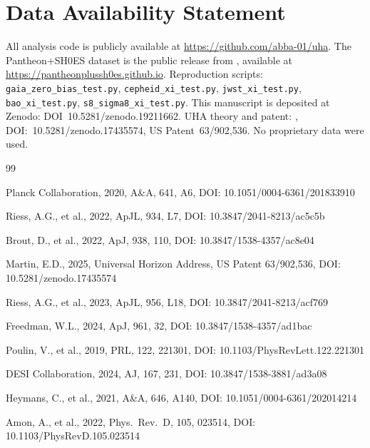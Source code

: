 \documentclass[12pt,a4paper]{article}
\begin{document}
\section*{Data Availability Statement}

All analysis code is publicly available at \url{https://github.com/abba-01/uha}.
The Pantheon+SH0ES dataset is the public release from \citet{brout2022},
available at \url{https://pantheonplussh0es.github.io}.
Reproduction scripts: \texttt{gaia\_zero\_bias\_test.py},
\texttt{cepheid\_xi\_test.py}, \texttt{jwst\_xi\_test.py},
\texttt{bao\_xi\_test.py}, \texttt{s8\_sigma8\_xi\_test.py}.
This manuscript is deposited at Zenodo: DOI~10.5281/zenodo.19211662.
UHA theory and patent: \citet{martin2025}, DOI:~10.5281/zenodo.17435574,
US Patent~63/902,536.
No proprietary data were used.


\begin{thebibliography}{99}

Planck Collaboration, 2020, A\&A, 641, A6,
DOI: 10.1051/0004-6361/201833910

Riess, A.G., et al., 2022, ApJL, 934, L7,
DOI: 10.3847/2041-8213/ac5c5b

Brout, D., et al., 2022, ApJ, 938, 110,
DOI: 10.3847/1538-4357/ac8e04

Martin, E.D., 2025, Universal Horizon Address, US Patent 63/902,536,
DOI: 10.5281/zenodo.17435574

Riess, A.G., et al., 2023, ApJL, 956, L18,
DOI: 10.3847/2041-8213/acf769

Freedman, W.L., 2024, ApJ, 961, 32,
DOI: 10.3847/1538-4357/ad1bac

Poulin, V., et al., 2019, PRL, 122, 221301,
DOI: 10.1103/PhysRevLett.122.221301

DESI Collaboration, 2024, AJ, 167, 231,
DOI: 10.3847/1538-3881/ad3a08

Heymans, C., et al., 2021, A\&A, 646, A140,
DOI: 10.1051/0004-6361/202014214

Amon, A., et al., 2022, Phys.\ Rev.\ D, 105, 023514,
DOI: 10.1103/PhysRevD.105.023514

\end{thebibliography}
\end{document}
